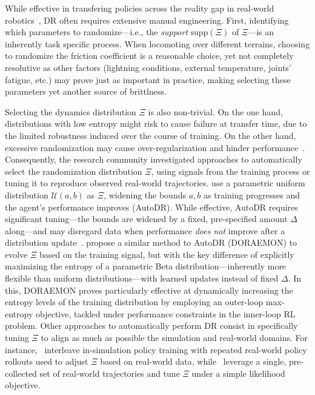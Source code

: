 While effective in transfering policies across the reality gap in real-world robotics~\citep{tobinDomainRandomizationTransferring2017,akkayaSolvingRubiksCube2019, jiDribbleBotDynamicLegged2023,tiboniDomainRandomizationEntropy2024}, DR often requires extensive manual engineering.
First, identifying which parameters to randomize---i.e., the \emph{support} \( \text{supp} (\Xi) \) of \( \Xi \)---is an inherently task specific process.
When locomoting over different terrains, choosing to randomize the friction coefficient is a reasonable choice, yet not completely resolutive as other factors (lightning conditions, external temperature, joints' fatigue, etc.) may prove just as important in practice, making selecting these parameters yet another source of brittlness.

Selecting the dynamics distribution \( \Xi \) is also non-trivial.
On the one hand, distributions with low entropy might risk to cause failure at transfer time, due to the limited robustness induced over the course of training.
On the other hand, excessive randomization may cause over-regularization and hinder performance~\citep{margolisRapidLocomotionReinforcement2022}.
Consequently, the research community investigated approaches to automatically select the randomization distribution \( \Xi \), using signals from the training process or tuning it to reproduce observed real-world trajectories.
\citet{akkayaSolvingRubiksCube2019} use a parametric uniform distribution \( \mathcal U(a, b) \) as \( \Xi \), widening the bounds \( a, b \) as training progresses and the agent's performance improves (AutoDR).
While effective, AutoDR requires significant tuning---the bounds are widened by a fixed, pre-specified amount \( \Delta \) along---and may disregard data when performance \emph{does not} improve after a distribution update~\citep{tiboniDomainRandomizationEntropy2024}. \citet{tiboniDomainRandomizationEntropy2024} propose a similar method to AutoDR (DORAEMON) to evolve \( \Xi \) based on the training signal, but with the key difference of explicitly maximizing the entropy of a parametric Beta distribution---inherently more flexible than uniform distributions---with learned updates instead of fixed \( \Delta \).
In this, DORAEMON proves particularly effective at dynamically increasing the entropy levels of the training distribution by employing an outer-loop max-entropy objective, tackled under performance constraints in the inner-loop RL problem.
Other approaches to automatically perform DR consist in specifically tuning \( \Xi \) to align as much as possible the simulation and real-world domains.
For instance,~\citet{chebotarClosingSimtorealLoop2019} interleave in-simulation policy training with repeated real-world policy rollouts used to adjust \( \Xi \) based on real-world data, while~\citet{tiboniDROPOSimtoRealTransfer2023} leverage a single, pre-collected set of real-world trajectories and tune \( \Xi \) under a simple likelihood objective.

